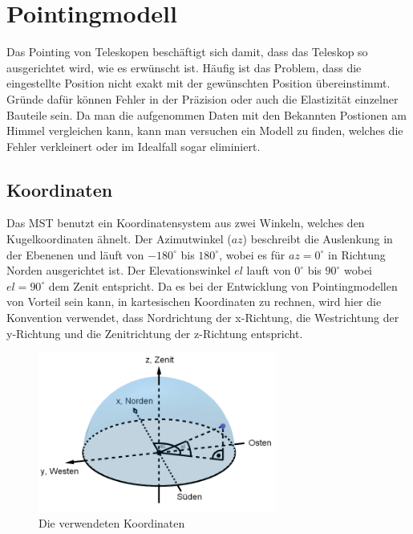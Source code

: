 \chapter{Pointingmodell}
Das Pointing von Teleskopen beschäftigt sich damit, dass das Teleskop so ausgerichtet wird, wie es erwünscht ist. Häufig ist das Problem, dass die eingestellte Position nicht exakt mit der gewünschten Position übereinstimmt. Gründe dafür können Fehler in der Präzision oder auch die Elastizität einzelner Bauteile sein. Da man die aufgenommen Daten mit den Bekannten Postionen am Himmel vergleichen kann, kann man versuchen ein Modell zu finden, welches die Fehler verkleinert oder im Idealfall sogar eliminiert.

\section{Koordinaten}
Das MST benutzt ein Koordinatensystem aus zwei Winkeln, welches den Kugelkoordinaten ähnelt. Der Azimutwinkel ($az$) beschreibt die Auslenkung in der Ebenenen und läuft von $-180^{\circ}$ bis $180^{\circ}$, wobei es für $az=0^{\circ}$ in Richtung Norden ausgerichtet ist. Der Elevationswinkel $el$ lauft von $0^{\circ}$ bis $90^{\circ}$ wobei $el=90^{\circ}$ dem Zenit entspricht. Da es bei der Entwicklung von Pointingmodellen von Vorteil sein kann, in kartesischen Koordinaten zu rechnen, wird hier die Konvention verwendet, dass Nordrichtung der x-Richtung, die Westrichtung der y-Richtung und die Zenitrichtung der z-Richtung entspricht.
\begin{figure}[htbp]
\centering
\includegraphics[width=0.7\textwidth]{Images/coordinates.png}
\caption{Die verwendeten Koordinaten}
\label{img:coordinates}
\end{figure}

